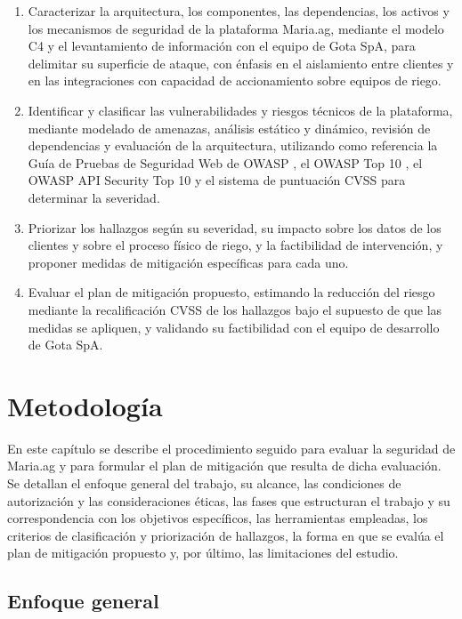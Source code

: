 \documentclass[12pt,letterpaper]{report}
\begin{document}
\begin{enumerate}[leftmargin=1.25cm]
    \item Caracterizar la arquitectura, los componentes, las dependencias, los activos y los mecanismos de seguridad de la plataforma Maria.ag, mediante el modelo C4 y el levantamiento de información con el equipo de Gota SpA, para delimitar su superficie de ataque, con énfasis en el aislamiento entre clientes y en las integraciones con capacidad de accionamiento sobre equipos de riego.
    \item Identificar y clasificar las vulnerabilidades y riesgos técnicos de la plataforma, mediante modelado de amenazas, análisis estático y dinámico, revisión de dependencias y evaluación de la arquitectura, utilizando como referencia la Guía de Pruebas de Seguridad Web de OWASP \autocite{owasp2024wstg}, el OWASP Top 10 \autocite{owasp2025top10}, el OWASP API Security Top 10 \autocite{owasp2023api} y el sistema de puntuación CVSS \autocite{first2023cvss} para determinar la severidad.
    \item Priorizar los hallazgos según su severidad, su impacto sobre los datos de los clientes y sobre el proceso físico de riego, y la factibilidad de intervención, y proponer medidas de mitigación específicas para cada uno.
    \item Evaluar el plan de mitigación propuesto, estimando la reducción del riesgo mediante la recalificación CVSS de los hallazgos bajo el supuesto de que las medidas se apliquen, y validando su factibilidad con el equipo de desarrollo de Gota SpA.
\end{enumerate}
\newpage

\chapter*{Metodología}

En este capítulo se describe el procedimiento seguido para evaluar la seguridad
de Maria.ag y para formular el plan de mitigación que resulta de dicha
evaluación. Se detallan el enfoque general del trabajo, su alcance, las
condiciones de autorización y las consideraciones éticas, las fases que
estructuran el trabajo y su correspondencia con los objetivos específicos, las
herramientas empleadas, los criterios de clasificación y priorización de
hallazgos, la forma en que se evalúa el plan de mitigación propuesto y, por
último, las limitaciones del estudio.

\section*{Enfoque general}
\end{document}

